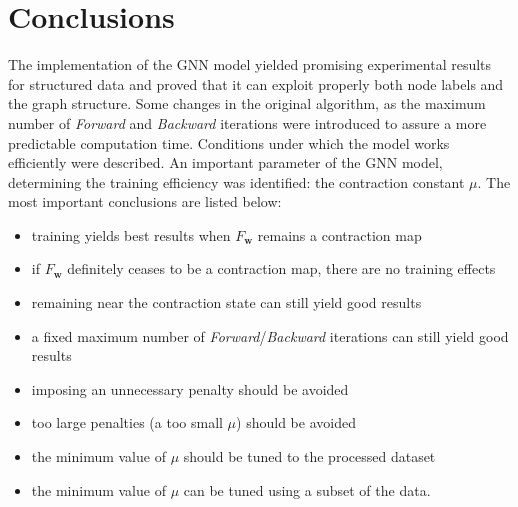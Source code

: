 
\chapter{Conclusions}
The implementation of the GNN model yielded promising experimental results for structured data and proved that it can exploit properly both node labels and the graph structure. Some changes in the original algorithm, as the maximum number of \emph{Forward} and \emph{Backward} iterations were introduced to assure a more predictable computation time. Conditions under which the model works efficiently were described. An important parameter of the GNN model, determining the training efficiency was identified: the contraction constant $\mu$. The most important conclusions are listed below:
\begin{itemize}
	\item training yields best results when $F_{\bm{w}}$ remains a contraction map
	\item if $F_{\bm{w}}$ definitely ceases to be a contraction map, there are no training effects
	\item remaining near the contraction state can still yield good results
	\item a fixed maximum number of \emph{Forward}/\emph{Backward} iterations can still yield good results
	\item imposing an unnecessary penalty should be avoided
	\item too large penalties (a too small $\mu$) should be avoided
	\item the minimum value of $\mu$ should be tuned to the processed dataset
	\item the minimum value of $\mu$ can be tuned using a subset of the data.
\end{itemize}
